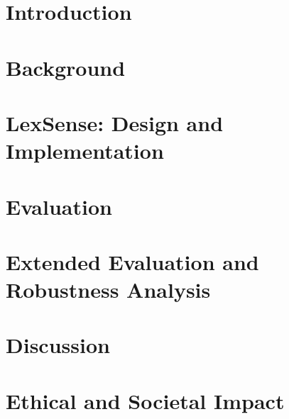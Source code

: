 \documentclass[pdflatex,sn-mathphys-num]{sn-jnl}%
\theoremstyle{thmstyleone}%
\theoremstyle{thmstyletwo}%
\theoremstyle{thmstylethree}%
\begin{document}







\maketitle

\section{Introduction}\label{sec:introduction}


\section{Background}\label{sec:background}



\section{LexSense: Design and Implementation}\label{sec:lexsense}



\section{Evaluation}\label{sec:evaluation}


\section{Extended Evaluation and Robustness Analysis}



\section{Discussion}\label{sec:discussion}



\section{Ethical and Societal Impact}

\end{document}

